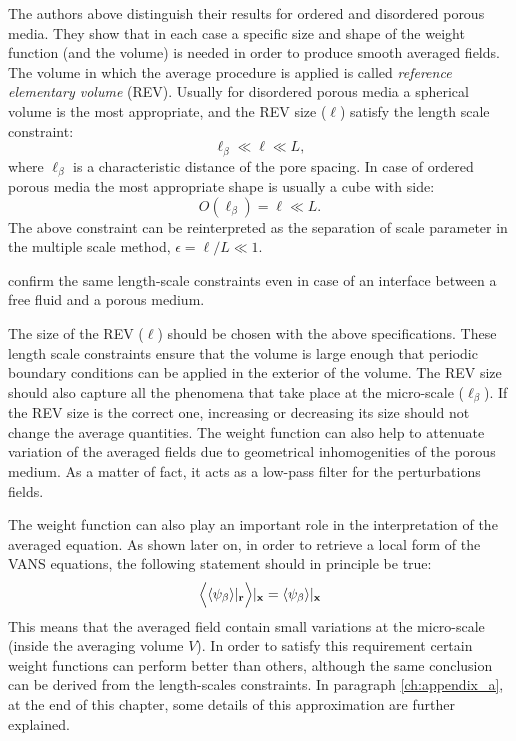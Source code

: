 The authors above distinguish their results for ordered and disordered porous media. They show that in each case a specific size and shape of the weight function (and the volume) is needed in order to produce smooth averaged fields.
The volume in which the average procedure is applied is called \textit{reference elementary volume} (REV).
Usually for disordered porous media a spherical volume is the most appropriate, and the REV size ($\ell$) satisfy the length scale constraint:
$$
\ell_{\beta} \ll \ell \ll L,
$$
where $\ell_{\beta}$ is a characteristic distance of the pore spacing. 
In case of ordered porous media the most appropriate shape is usually a cube with side:
$$
O(\ell_{\beta}) = \ell \ll L.
$$
The above constraint can be reinterpreted as the separation of scale parameter in the multiple scale method, $\epsilon = \ell/L \ll 1$.

\citet{ochoa1995momentum} confirm the same length-scale constraints even in case of an interface between a free fluid and a porous medium.

The size of the REV ($\ell$) should be chosen with the above specifications. These length scale constraints ensure that the volume is large enough that periodic boundary conditions can be applied in the exterior of the volume. The REV size should also capture all the phenomena that take place at the micro-scale ($\ell_{\beta}$).
If the REV size is the correct one, increasing or decreasing its size should not change the average quantities. The weight function can also help to attenuate variation of the averaged fields due to geometrical inhomogenities of the porous medium. As a matter of fact, it acts as a low-pass filter for the perturbations fields.

The weight function can  also play an important role in the interpretation of the averaged equation. As shown later on, in order to retrieve a local form of the VANS equations, the following statement should in principle be true:
\begin{equation}
\Big\langle {\left< \psi_{\beta} \right>}|_{\mathbf{r}}  \Big\rangle  |_{\mathbf{x}} = {\left< \psi_{\beta} \right>}|_{\mathbf{x}}
\label{eq:well_behaved}
\end{equation}
This means that the averaged field contain small variations at the micro-scale (inside the averaging volume $V$).
In order to satisfy this requirement certain weight functions can perform better than others, although the same conclusion can be derived from the length-scales constraints.
In paragraph \ref{ch:appendix_a}, at the end of this chapter, some details of this approximation are further explained.


